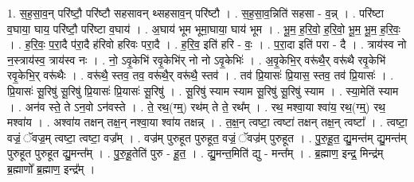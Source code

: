 \documentclass[17pt]{extarticle}
\begin{document}
1. स॒ह॒सा॒व॒न् परि॑ष्टौ॒ परि॑ष्टौ सहसावन् थ्सहसाव॒न् परि॑ष्टौ । . स॒ह॒सा॒व॒न्निति॑ सहसा - व॒न्न् । . परि॑ष्टा व॒घाया॒ घाय॒ परि॑ष्टौ॒ परि॑ष्टा व॒घाय॑ । . अ॒घाय॑ भूम भूमा॒घाया॒ घाय॑ भूम । . भू॒म॒ ह॒रि॒वो॒ ह॒रि॒वो॒ भू॒म॒ भू॒म॒ ह॒रि॒वः॒ । . ह॒रि॒वः॒ प॒रा॒दै प॑रा॒दै ह॑रिवो हरिवः परा॒दै । . ह॒रि॒व॒ इति॑ हरि - वः॒ । . प॒रा॒दा इति॑ परा - दै । . त्राय॑स्व नो न॒स्त्राय॑स्व॒ त्राय॑स्व नः । . नो॒ ऽवृ॒केभि॑ रवृ॒केभि॑र् नो नो ऽवृ॒केभिः॑ । . अ॒वृ॒केभि॒र् वरू॑थै॒र् वरू॑थै रवृ॒केभि॑ रवृ॒केभि॒र् वरू॑थैः । . वरू॑थै॒ स्तव॒ तव॒ वरू॑थै॒र् वरू॑थै॒ स्तव॑ । . तव॑ प्रि॒यासः॑ प्रि॒यास॒ स्तव॒ तव॑ प्रि॒यासः॑ । . प्रि॒यासः॑ सू॒रिषु॑ सू॒रिषु॑ प्रि॒यासः॑ प्रि॒यासः॑ सू॒रिषु॑ । . सू॒रिषु॑ स्याम स्याम सू॒रिषु॑ सू॒रिषु॑ स्याम । . स्या॒मेति॑ स्याम । . अन॑व स्ते॒ ते ऽन॒वो ऽन॑वस्ते । . ते॒ रथ॒(ग्म्॒) रथ॑म् ते ते॒ रथ᳚म् । . रथ॒ मश्वा॒या श्वा॑य॒ रथ॒(ग्म्॒) रथ॒ मश्वा॑य । . अश्वा॑य तक्षन् तक्ष॒न् नश्वा॒या श्वा॑य तक्षन्न् । . त॒क्ष॒न् त्वष्टा॒ त्वष्टा॑ तक्षन् तक्ष॒न् त्वष्टा᳚ । . त्वष्टा॒ वज्रं॒ ॅवज्र॒म् त्वष्टा॒ त्वष्टा॒ वज्र᳚म् । . वज्र॑म् पुरुहूत पुरुहूत॒ वज्रं॒ ॅवज्र॑म् पुरुहूत । . पु॒रु॒हू॒त॒ द्यु॒मन्त॑म् द्यु॒मन्त॑म् पुरुहूत पुरुहूत द्यु॒मन्त᳚म् । . पु॒रु॒हू॒तेति॑ पुरु - हू॒त॒ । . द्यु॒मन्त॒मिति॑ द्यु - मन्त᳚म् । . ब्र॒ह्माण॒ इन्द्र॒ मिन्द्र॑म् ब्र॒ह्माणो᳚ ब्र॒ह्माण॒ इन्द्र᳚म् । \newline
\end{document}
